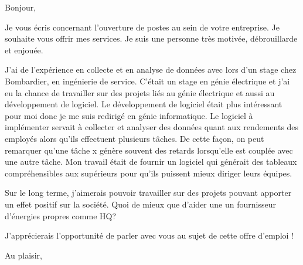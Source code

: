 \documentclass[12pt,french]{letter}
\begin{document}
\pagestyle{headings}

\begin{letter}{}
\address{Montréal, Canada}

\opening{Bonjour,}


Je vous écris concernant l'ouverture de postes au sein de votre entreprise. Je souhaite vous offrir mes services.
Je suis une personne très motivée, débrouillarde et enjouée. 

J'ai de l'expérience en collecte et en analyse de données avec lors d'un stage chez Bombardier, en ingénierie de service. C'était un stage en génie électrique et j'ai eu la chance de travailler sur des projets liés au génie électrique et aussi au développement de logiciel. Le développement de logiciel était plus intéressant pour moi donc je me suis redirigé en génie informatique. Le logiciel à implémenter servait à collecter et analyser des données quant aux rendements des employés alors qu'ils effectuent plusieurs tâches. De cette façon, on peut remarquer qu'une tâche x génère souvent des retards lorsqu'elle est couplée avec une autre tâche. Mon travail était de fournir un logiciel qui générait des tableaux compréhensibles aux supérieurs pour qu'ils puissent mieux diriger leurs équipes. 

Sur le long terme, j'aimerais pouvoir travailler sur des projets pouvant apporter un effet positif sur la société. Quoi de mieux que d'aider une un fournisseur d'énergies propres comme HQ?

J'apprécierais l'opportunité de parler avec vous au sujet de cette offre d'emploi !

\signature{Maxime}

\closing{Au plaisir,}


\end{letter}
\end{document}
